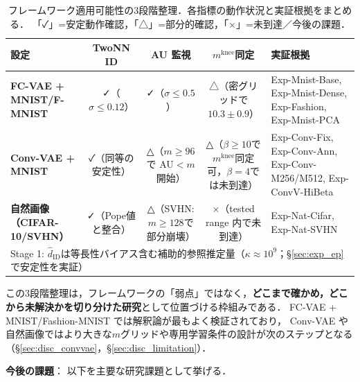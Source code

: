 \documentclass[11pt,a4paper]{jsarticle}
\newcommand{\kap}{\kappa}
\newcommand{\mknee}{m^{\mathrm{knee}}}
\begin{document}
\begin{table}[H]
\centering
\caption{フレームワーク適用可能性の3段階整理．各指標の動作状況と実証根拠をまとめる．
「✓」=安定動作確認，「△」=部分的確認，「×」=未到達／今後の課題．}
\label{tab:applicability_tier}
\small
\begin{tabular}{lcccp{3.8cm}}
\toprule
設定 & TwoNN ID & AU 監視 & $\mknee$同定 & 実証根拠 \\
\midrule
\textbf{FC-VAE + MNIST/F-MNIST}
  & ✓（$\sigma\leq0.12$）
  & ✓（$\sigma\leq0.5$）
  & △（密グリッドで$10.3\pm0.9$）
  & Exp-Mnist-Base, Exp-Mnist-Dense, Exp-Fashion, Exp-Mnist-PCA \\
\addlinespace
\textbf{Conv-VAE + MNIST}
  & ✓（同等の安定性）
  & △（$m\geq96$で AU$<m$開始）
  & △（$\beta\geq10$で$\mknee$同定可，$\beta=4$では未到達）
  & Exp-Conv-Fix, Exp-Conv-Ann, Exp-Conv-M256/M512, Exp-ConvV-HiBeta \\
\addlinespace
\textbf{自然画像（CIFAR-10/SVHN）}
  & ✓（Pope値と整合）
  & △（SVHN: $m\geq128$で部分崩壊）
  & ×（tested range 内で未到達）
  & Exp-Nat-Cifar, Exp-Nat-SVHN \\
\midrule
\multicolumn{5}{l}{\small Stage 1: $\hat{d}_\mathrm{ID}$は等長性バイアス含む補助的参照推定量（$\kap\approx10^9$；§\ref{sec:exp_ep}で安定性を実証）}\\
\bottomrule
\end{tabular}
\end{table}

この3段階整理は，フレームワークの「弱点」ではなく，\textbf{どこまで確かめ，どこから未解決かを切り分けた研究}として位置づける枠組みである．
FC-VAE + MNIST/Fashion-MNIST では解釈論が最もよく検証されており，
Conv-VAE や自然画像ではより大きな$m$グリッドや専用学習条件の設計が次のステップとなる
（§\ref{sec:disc_convvae}，§\ref{sec:disc_limitation}）．

\textbf{今後の課題}：
以下を主要な研究課題として挙げる．
\end{document}
